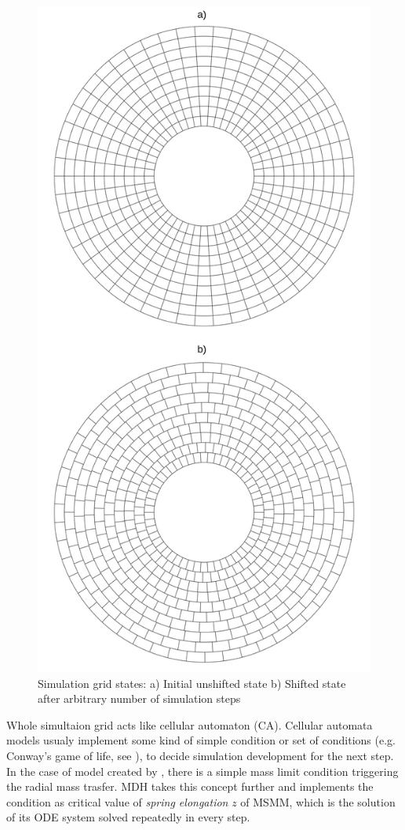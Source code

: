 \begin{figure}
\centering
\includegraphics[width=0.75\columnwidth]{img/grid_states.png}
\caption{Simulation grid states: a) Initial unshifted state b) Shifted state after arbitrary number of simulation steps}
\label{fig:grid_states}
\end{figure}

Whole simultaion grid acts like cellular automaton (CA). Cellular automata models usualy implement some kind of simple condition or set of conditions (e.g. Conway's game of life, see \cite{gardner1970}), to decide simulation development for the next step. In the case of model created by \cite{yonehara1997}, there is a simple mass limit condition triggering the radial mass trasfer. MDH takes this concept further and implements the condition as critical value of \emph{spring elongation} $z$ of MSMM, which is the solution of its ODE system solved repeatedly in every step. 

